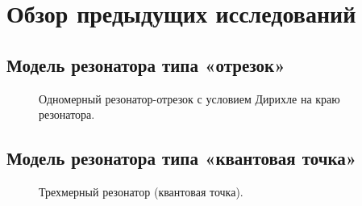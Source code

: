 \chapter{Обзор предыдущих исследований}\label{chap:prev_res}

\section{Модель резонатора типа «отрезок»}

\begin{figure}[!htb]
\centering
\begin{tikzpicture}[scale=1.1]

\end{tikzpicture}
\caption{Одномерный резонатор-отрезок с условием Дирихле на краю резонатора.}
\end{figure}

\section{Модель резонатора типа «квантовая точка»}

\begin{figure}[!htb]
\centering
\begin{tikzpicture}[scale=1.1]

\end{tikzpicture}
\caption{Трехмерный резонатор (квантовая точка).}
\end{figure}
